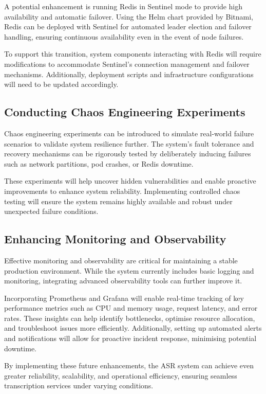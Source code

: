 A potential enhancement is running Redis in Sentinel mode to provide high availability and automatic failover. Using the Helm chart provided by Bitnami, Redis can be deployed with Sentinel for automated leader election and failover handling, ensuring continuous availability even in the event of node failures.  

To support this transition, system components interacting with Redis will require modifications to accommodate Sentinel's connection management and failover mechanisms. Additionally, deployment scripts and infrastructure configurations will need to be updated accordingly.  

\subsection{Conducting Chaos Engineering Experiments}

Chaos engineering experiments can be introduced to simulate real-world failure scenarios to validate system resilience further. The system's fault tolerance and recovery mechanisms can be rigorously tested by deliberately inducing failures such as network partitions, pod crashes, or Redis downtime.  

These experiments will help uncover hidden vulnerabilities and enable proactive improvements to enhance system reliability. Implementing controlled chaos testing will ensure the system remains highly available and robust under unexpected failure conditions.  

\subsection{Enhancing Monitoring and Observability}

Effective monitoring and observability are critical for maintaining a stable production environment. While the system currently includes basic logging and monitoring, integrating advanced observability tools can further improve it.  

Incorporating Prometheus and Grafana will enable real-time tracking of key performance metrics such as CPU and memory usage, request latency, and error rates. These insights can help identify bottlenecks, optimise resource allocation, and troubleshoot issues more efficiently. Additionally, setting up automated alerts and notifications will allow for proactive incident response, minimising potential downtime.  

By implementing these future enhancements, the ASR system can achieve even greater reliability, scalability, and operational efficiency, ensuring seamless transcription services under varying conditions.
